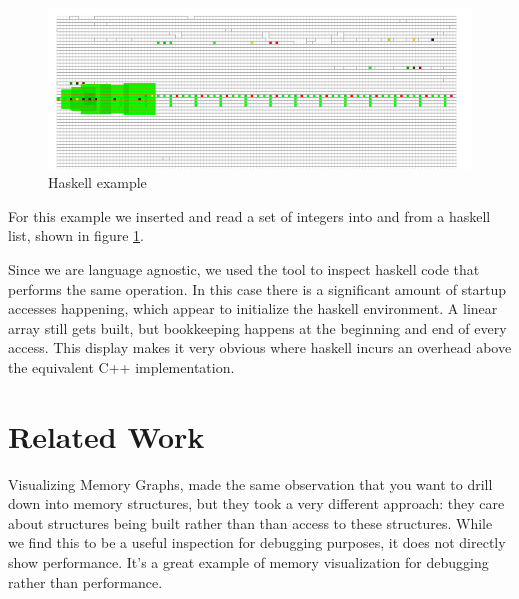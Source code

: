 \documentclass[annual]{acmsiggraph}
\begin{document}
  \begin{figure}[t]
		\centering
    \includegraphics[scale=0.45]{images/example_haskell.png}
		\caption{Haskell example}
    \label{fig:example_haskell}
	\end{figure}

  For this example we inserted and read a set of integers into and from a haskell list, shown in figure \ref{fig:example_haskell}.
  
  Since we are language agnostic, we used the tool to inspect haskell code that performs the same operation. In this case there is a significant amount of startup accesses happening, which appear to initialize the haskell environment. A linear array still gets built, but bookkeeping happens at the beginning and end of every access. This display makes it very obvious where haskell incurs an overhead above the equivalent C++ implementation.
  

\section{Related Work}\label{ch_r}

Visualizing Memory Graphs\cite{zimmerman:2001:VMG}, made the same observation that you want to drill down into memory structures, but they took a very different approach: they care about structures being built rather than than access to these structures. While we find this to be a useful inspection for debugging purposes, it does not directly show performance. It's a great example of memory visualization for debugging rather than performance.
\end{document}
